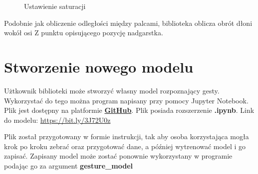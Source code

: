 \begin{figure}[H]
    \centering
    \hfill
    \caption{Ustawienie saturacji}
\end{figure}


\quad Podobnie jak obliczenie odległości między palcami, biblioteka oblicza obrót dłoni wokół osi Z punktu opisującego pozycję nadgarstka.


\section{Stworzenie nowego modelu}

\quad Użtkownik biblioteki może stworzyć własny model rozpoznający gesty. Wykorzystać do tego można program napisany przy pomocy Jupyter Notebook. Plik jest dostępny na platformie \href{https://bit.ly/3J72U0z}{\textbf{GitHub}}. Plik posiada rozszerzenie \textbf{.ipynb}. Link do modelu: \href{https://bit.ly/3J72U0z}{https://bit.ly/3J72U0z}

\quad Plik został przygotowany w formie instrukcji, tak aby osoba korzystająca mogła krok po kroku zebrać oraz przygotować dane, a później wytrenować model i go zapisać. Zapisany model może zostać ponownie wykorzystany w programie podając go za argument \textbf{gesture\_model}
